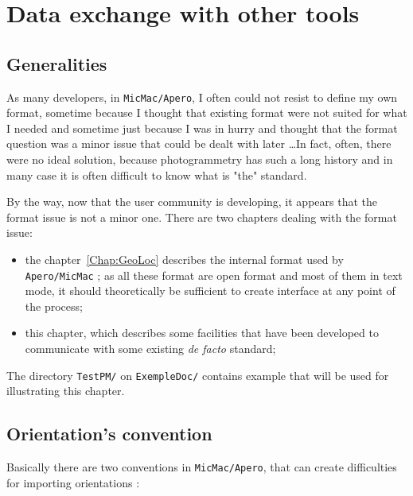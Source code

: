 \chapter{Data exchange with other tools}

\section{Generalities}

As many developers, in {\tt MicMac/Apero}, I often could not resist to
define my own format, sometime because I thought that existing
format were not suited for what I needed and sometime just because I was in
hurry and thought that the format question was a minor issue that could be
dealt with later \dots In fact, often, there were no ideal solution, because
photogrammetry has such a long history and in many case it is often difficult to
know what is "the" standard.

\vspace{\baselineskip}
By the way, now that the user community is developing, it appears that the format issue
is not a minor one. There are two chapters dealing with the format issue:

\begin{itemize}
   \item  the chapter~\ref{Chap:GeoLoc} describes the internal format used
          by {\tt Apero/MicMac} ; as all these
          format are open format and most of them in text mode, it should theoretically be sufficient
          to create interface at any point of the process;

   \item  this chapter, which describes some facilities that have been developed to communicate
          with some existing \emph{de facto} standard;
\end{itemize}

The directory {\tt TestPM/} on {\tt ExempleDoc/} contains example that will be used for
illustrating this chapter.


\section{Orientation's convention}

Basically there are two conventions in {\tt MicMac/Apero}, that can create
difficulties for importing orientations :

